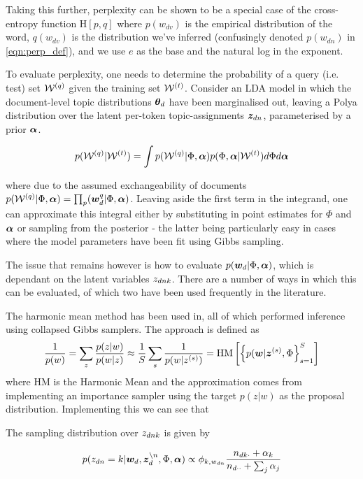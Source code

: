 Taking this further, perplexity can be shown to be a special case of the cross-entropy function $\text{H}[p,q]$ where $p(w_{dv})$ is the empirical distribution of the word, $q(w_{dv})$ is the distribution we've inferred (confusingly denoted $p(w_{dn})$ in \eqref{eqn:perp_def}), and we use $e$ as the base and the natural log in the exponent. 

To evaluate perplexity, one needs to determine the probability of a query (i.e. test) set $\mathcal{W}^{(q)}$ given the training set $\mathcal{W}^{(t)}$. Consider an LDA model in which the document-level topic distributions ${ \bm \theta_d }$ have been marginalised out, leaving a Polya distribution over the latent per-token topic-assignments ${ \bm z_{dn} }$, parameterised by a prior $\bm \alpha$.

\begin{align}
p(\mathcal{W}^{(q)}|\mathcal{W}^{(t)}) = \int p(\mathcal{W}^{(q)}|\Phi, \bm \alpha)p(\Phi,\bm \alpha | \mathcal{W}^{(t)}) d\Phi d\bm \alpha
\end{align}

where due to the assumed exchangeability of documents $p(\mathcal{W}^{(q)}|\Phi, \bm \alpha) = \prod_ p(\bm w_d^{q}|\Phi, \bm \alpha)$. Leaving aside the first term in the integrand, one can approximate this integral either by substituting in point estimates for $\Phi$ and $\bm \alpha$ or sampling from the posterior - the latter being particularly easy in cases where the model parameters have been fit using Gibbs sampling.

The issue that remains however is how to evaluate $p(\bm w_d|\Phi, \bm \alpha)$, which is dependant on the latent variables ${ z_{dnk} }$. There are a number of ways in which this can be evaluated, of which two have been used frequently in the literature.

The harmonic mean method has been used in\cite{Griffiths2004}\cite{Griffiths2005}\cite{Wallach2006}, all of which performed inference using collapsed Gibbs samplers. The approach is defined as
\begin{align}
\frac{1}{ {p(w)} } = \sum_z \frac{p(z|w)}{p(w|z)} \approx \frac{1}{ {S} } \sum_s \frac{1}{ {p(w|{ z }^{(s)})} }
=  \text{HM}\left[ \left\{ p(\bm w|{ \bm z }^{(s)}, \Phi \right\}_{s=1}^{S}  \right]
\end{align}
where HM is the Harmonic Mean and the approximation comes from implementing an importance sampler using the target $p(z|w)$ as the proposal distribution. Implementing this we can see that 

The sampling distribution over ${ z_{dnk} }$ is given by

\begin{align}
p(z_{dn} = k | \bm w_d, \bm z_d^{\setminus n}, \Phi, \bm \alpha) \propto \phi_{k,{w_{dn}}}\frac{n_{dk\cdot} + \alpha_k}{n_{d\cdot\cdot} + \sum_j \alpha_j}
\end{align}

